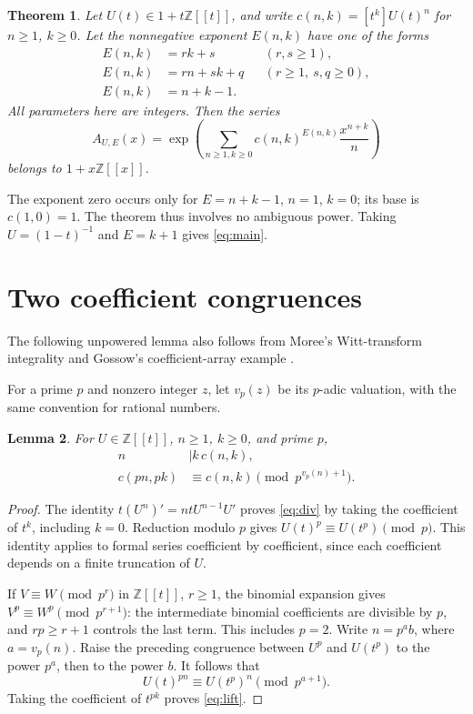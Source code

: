 \documentclass[11pt]{article}
\newtheorem{theorem}{Theorem}
\newtheorem{lemma}[theorem]{Lemma}
\begin{document}
\begin{theorem}\label{thm:general}
Let \(U(t)\in1+t\mathbb Z[[t]]\), and write
\(c(n,k)=[t^k]U(t)^n\) for \(n\ge1\), \(k\ge0\).
Let the nonnegative exponent $E(n,k)$ have one of the forms
\begin{align*}
 E(n,k)&=rk+s &&(r,s\ge1),\\
 E(n,k)&=rn+sk+q &&(r\ge1,\ s,q\ge0),\\
 E(n,k)&=n+k-1.
\end{align*}
All parameters here are integers. Then
the series
\begin{equation}\label{eq:general}
 A_{U,E}(x)=\exp\left(\sum_{n\ge1,k\ge0}
                      c(n,k)^{E(n,k)}\frac{x^{n+k}}{n}\right)
\end{equation}
belongs to \(1+x\mathbb Z[[x]]\).
\end{theorem}

The exponent zero occurs only for \(E=n+k-1\), \(n=1\), \(k=0\);
its base is \(c(1,0)=1\). The theorem thus involves no ambiguous power.
Taking \(U=(1-t)^{-1}\) and \(E=k+1\) gives \eqref{eq:main}.

\section{Two coefficient congruences}

The following unpowered lemma also follows from Moree's Witt-transform
integrality and Gossow's coefficient-array example \cite{moree,gossow}.

For a prime \(p\) and nonzero integer \(z\), let \(v_p(z)\) be its
\(p\)-adic valuation, with the same convention for rational numbers.

\begin{lemma}\label{lem:coeff}
For \(U\in\mathbb Z[[t]]\), \(n\ge1\), \(k\ge0\), and prime \(p\),
\begin{align}
 n&\mid k\,c(n,k),\label{eq:div}\\
 c(pn,pk)&\equiv c(n,k)\pmod {p^{v_p(n)+1}}.\label{eq:lift}
\end{align}
\end{lemma}
\begin{proof}
The identity \(t(U^n)'=ntU^{n-1}U'\) proves \eqref{eq:div} by taking
the coefficient of \(t^k\), including \(k=0\).
Reduction modulo \(p\) gives \(U(t)^p\equiv U(t^p)\pmod p\).
This identity applies to formal series coefficient by coefficient, since
each coefficient depends on a finite truncation of \(U\).

If \(V\equiv W\pmod {p^r}\) in \(\mathbb Z[[t]]\), \(r\ge1\), the
binomial expansion gives \(V^p\equiv W^p\pmod {p^{r+1}}\): the intermediate
binomial coefficients are divisible by \(p\), and \(rp\ge r+1\) controls
the last term. This includes \(p=2\).
Write \(n=p^a b\), where \(a=v_p(n)\). Raise the preceding congruence
between \(U^p\) and \(U(t^p)\) to the power \(p^a\), then to the power
\(b\). It follows that
\[
 U(t)^{pn}\equiv U(t^p)^n\pmod {p^{a+1}}.
\]
Taking the coefficient of \(t^{pk}\) proves \eqref{eq:lift}.
\end{proof}
\end{document}
